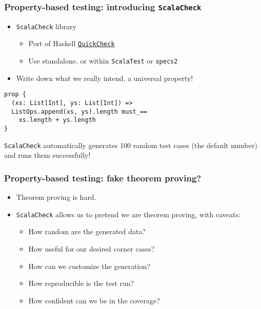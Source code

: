 \documentclass{beamer}
\begin{document}
\begin{frame}[fragile]
  \frametitle{Property-based testing: introducing \texttt{ScalaCheck}}

  \begin{itemize}
    \item \texttt{ScalaCheck} library
      \begin{itemize}
        \item Port of Haskell \href{http://en.wikipedia.org/wiki/QuickCheck}{\texttt{QuickCheck}}
        \item Use standalone, or within \texttt{ScalaTest} or \texttt{specs2}
      \end{itemize}
    \item Write down what we really intend, a universal property!
  \end{itemize}

  \begin{verbatim}
prop {
  (xs: List[Int], ys: List[Int]) =>
  ListOps.append(xs, ys).length must_==
    xs.length + ys.length
}
  \end{verbatim}

  \texttt{ScalaCheck} automatically generates 100 random test cases (the default number) and runs them successfully!

\end{frame}

\begin{frame}
  \frametitle{Property-based testing: fake theorem proving?}

  \begin{itemize}
    \item<1-> Theorem proving is hard.
    \item<2-> \texttt{ScalaCheck} allows us to pretend we are theorem proving, with caveats:
      \begin{itemize}
        \item<3-> How random are the generated data?
        \item<4-> How useful for our desired corner cases?
        \item<5-> How can we customize the generation?
        \item<6-> How reproducible is the test run?
        \item<7-> How confident can we be in the coverage?
      \end{itemize}
  \end{itemize}


\end{frame}
\end{document}
